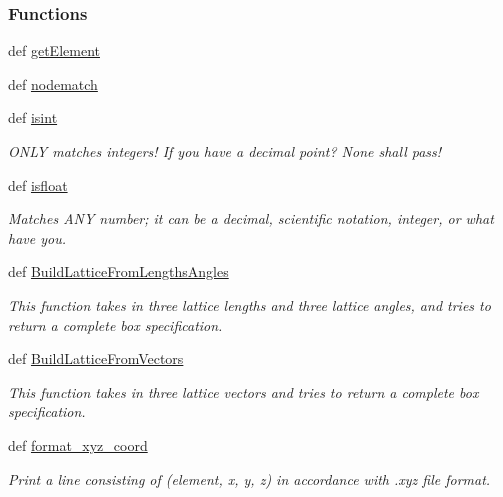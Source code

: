 \subsubsection*{\-Functions}
\begin{DoxyCompactItemize}
\item 
def \hyperlink{namespaceforcebalance_1_1molecule_af28de4693e5b8e82df900d0ac3c6c370}{get\-Element}
\item 
def \hyperlink{namespaceforcebalance_1_1molecule_ab8464fea13fad2a506792c2f1d7c93f3}{nodematch}
\item 
def \hyperlink{namespaceforcebalance_1_1molecule_a0dd31eff88d2bed0884ab21a13261d42}{isint}
\begin{DoxyCompactList}\small\item\em \-O\-N\-L\-Y matches integers! \-If you have a decimal point? \-None shall pass! \end{DoxyCompactList}\item 
def \hyperlink{namespaceforcebalance_1_1molecule_afe989ffd119568047fc8265b1d329a70}{isfloat}
\begin{DoxyCompactList}\small\item\em \-Matches \-A\-N\-Y number; it can be a decimal, scientific notation, integer, or what have you. \end{DoxyCompactList}\item 
def \hyperlink{namespaceforcebalance_1_1molecule_a0a6e3e79b04534bf2e83d09def189444}{\-Build\-Lattice\-From\-Lengths\-Angles}
\begin{DoxyCompactList}\small\item\em \-This function takes in three lattice lengths and three lattice angles, and tries to return a complete box specification. \end{DoxyCompactList}\item 
def \hyperlink{namespaceforcebalance_1_1molecule_a29fb1ac9324f4280f07c65baea339989}{\-Build\-Lattice\-From\-Vectors}
\begin{DoxyCompactList}\small\item\em \-This function takes in three lattice vectors and tries to return a complete box specification. \end{DoxyCompactList}\item 
def \hyperlink{namespaceforcebalance_1_1molecule_a2eba3cad44138b3b10ea883240888412}{format\-\_\-xyz\-\_\-coord}
\begin{DoxyCompactList}\small\item\em \-Print a line consisting of (element, x, y, z) in accordance with .xyz file format. \end{DoxyCompactList}\item 

\end{DoxyCompactItemize}
